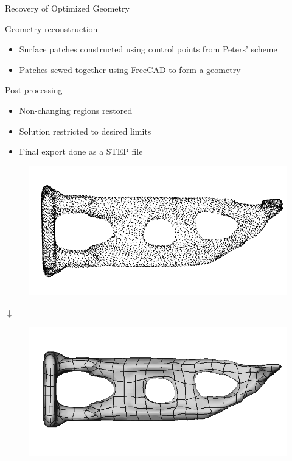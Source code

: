 \begin{frame}{Recovery of Optimized Geometry}
	\begin{minipage}[t]{0.5\linewidth}
		\begin{block}{Geometry reconstruction}
			\begin{itemize}
				\item Surface patches constructed using control points from Peters' scheme \\
				\item Patches sewed together using FreeCAD to form a geometry \\
			\end{itemize}
		\end{block}
		\begin{block}{Post-processing}
			\begin{itemize}
				\item Non-changing regions restored \\
				\item Solution restricted to desired limits \\
				\item Final export done as a STEP file
			\end{itemize}
		\end{block}
	\end{minipage}
	\hfill
	\begin{minipage}[t]{0.45\linewidth}
		\vspace{-0.25cm}
		\begin{figure}
			\includegraphics[width=.88\textwidth]{Pictures/SecondHalf/Back2CAD1}
		\end{figure}
		\vspace{-0.75cm}
		\begin{center}
			$\downarrow$
		\end{center}
		\vspace{-0.6cm}
		\begin{figure}
			\includegraphics[width=.88\textwidth]{Pictures/SecondHalf/Back2CAD2}

\end{figure}
\end{minipage}
\end{frame}
